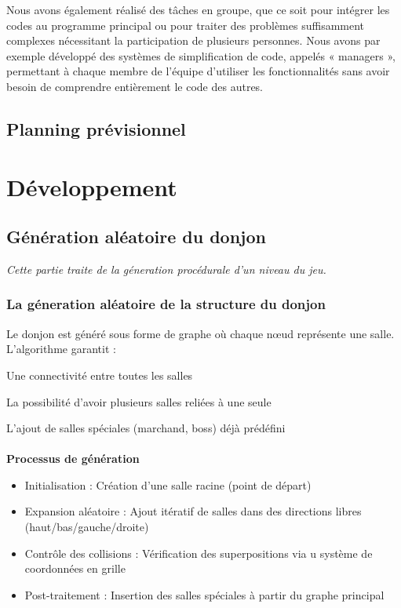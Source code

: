\documentclass[a4paper,11pt]{article}
\begin{document}
Nous avons également réalisé des tâches en groupe, que ce soit pour intégrer les codes au programme principal ou pour traiter des problèmes suffisamment complexes nécessitant la participation de plusieurs personnes. Nous avons par exemple développé des systèmes de simplification de code, appelés « managers », permettant à chaque membre de l'équipe d'utiliser les fonctionnalités sans avoir besoin de comprendre entièrement le code des autres.

\subsection{Planning prévisionnel}


\newpage
\section{Développement}

\subsection{Génération aléatoire du donjon}
\textit{Cette partie traite de la géneration procédurale d'un niveau du jeu.}
\subsubsection{La géneration aléatoire de la structure du donjon}

Le donjon est généré sous forme de graphe où chaque nœud représente une salle. L'algorithme garantit :

    Une connectivité entre toutes les salles

    La possibilité d'avoir plusieurs salles reliées à une seule

    L'ajout de salles spéciales (marchand, boss) déjà prédéfini 
\\\\
\textbf{Processus de génération}
\begin{itemize}
    \item Initialisation : Création d'une salle racine (point de départ)
    \item Expansion aléatoire : Ajout itératif de salles dans des directions libres (haut/bas/gauche/droite)
    \item Contrôle des collisions : Vérification des superpositions via u système de coordonnées en grille
    \item Post-traitement : Insertion des salles spéciales à partir du graphe principal
\end{itemize}
\end{document}

